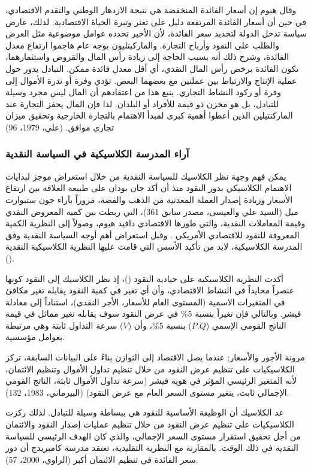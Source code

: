 \documentclass[10pt,a4paper]{report}
\begin{document}
\begin{doublespacing}
وقال هيوم إن أسعار الفائدة المنخفضة هي نتيجة الازدهار الوطني والتقدم الاقتصادي، في حين أن أسعار الفائدة المرتفعة دليل على تعثر وتيرة الحياة الاقتصادية. لذلك، عارض سياسة تدخل الدولة لتحديد سعر الفائدة، لأن الأخير تحدده عوامل موضوعية مثل العرض والطلب على النقود وأرباح التجارة. والماركيتليون بوجه عام هاجموا ارتفاع معدل الفائدة، وشرح ذلك أنه بسبب الحاجة إلى زيادة رأس المال والقروض واستثمارهما، تكون الفائدة برخص رأس المال النقدي، أي أقل معدل فائدة ممكن. التبادل يدور حول عملية الإنتاج والارتباط بين عملتين مع بعضهما البعض. تؤدي وفرة أو ندرة الأموال إلى وفرة أو ركود النشاط التجاري. ينبع هذا من اعتقادهم أن المال ليس مجرد وسيلة للتبادل، بل هو مخزن ذو قيمة للأفراد أو البلدان. لذا فإن المال يحفز التجارة عند الماركنتيلين الذين أعطوا أهمية كبرى لمبدأ الاهتمام بالتجارة الخارجية وتحقيق ميزان تجاري موافق. (علي، 1979، 96)
\subsubsection{آراء المدرسة الكلاسيكية في السياسة النقدية}
يمكن فهم وجهة نظر الكلاسيك للسياسة النقدية من خلال استعراض موجز لبدايات الاهتمام الكلاسيكي بدور النقود منذ أن أكد جان بودان على طبيعة العلاقة بين ارتفاع الأسعار وزيادة إصدار العملة المعدنية من الذهب والفضة، مروراً بآراء جون ستيوارت ميل (السيد علي والعيسى، مصدر سابق 361)، التي ربطت بين كمية المعروض النقدي وقيمة المعاملات النقدية، والتي طورها الاقتصادي دافيد هيوم، وصولاً إلى النظرية الكمية المعروفة للنقود للاقتصادي الأمريكي . وقبل استعراض أهم أوجه السياسة النقدية وفق المدرسة الكلاسيكية، لابد من تأكيد الأسس التي قامت عليها النظرية الكلاسيكية النقدية ().

أكدت النظرية الكلاسيكية على حيادية النقود ()، إذ نظر الكلاسيك إلى النقود كونها عنصراً محايداً في النشاط الاقتصادي، وأن أي تغير في كمية النقود يقابله تغير مكافئ في المتغيرات الاسمية (المستوى العام للأسعار، الأجر النقدي)، استناداً إلى معادلة فيشر. وبالتالي فإن تغيراً بنسبة 5\% في عرض النقود سوف يقابله تغير مماثل في قيمة الناتج القومي الإسمي (\(P.Q\)) بنسبة 5\%، وأن (\(V\)) سرعة التداول ثابتة وهي مرتبطة بعوامل مؤسسية.

مرونة الأجور والأسعار: عندما يصل الاقتصاد إلى التوازن بناءً على البيانات السابقة، تركز الكلاسيكيات على تنظيم عرض النقود من خلال تنظيم تداول الأموال وتنظيم الائتمان، لأنه المتغير الرئيسي المؤثر في هوية فيشر (سرعة تداول الأموال ثابتة، الناتج القومي الإجمالي ثابت، يتغير مستوى السعر العام مع عرض النقود) (البيرماني، 1983، 132).

عد الكلاسيك أن الوظيفة الأساسية للنقود هي ببساطة وسيلة للتبادل. لذلك ركزت الكلاسيكيات على تنظيم عرض النقود من خلال تنظيم عمليات إصدار النقود والائتمان من أجل تحقيق استقرار مستوى السعر الإجمالي، والذي كان الهدف الرئيسي للسياسة النقدية في ذلك الوقت. بالمقارنة مع النظرية التقليدية، تعتقد مدرسة كامبريدج أن دور سعر الفائدة في تنظيم الائتمان أكبر ({الراوي، 2000، 57}).


\end{doublespacing}
\end{document}
